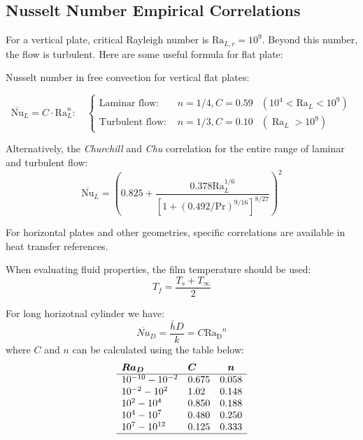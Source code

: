 \subsection*{Nusselt Number Empirical Correlations}
For a vertical plate, critical Rayleigh number is $\mathrm{Ra}_{L,c} = 10^9$. Beyond this number, the flow is turbulent. Here are some useful formula for flat plate:

\begin{definition}
Nusselt number in free convection for vertical flat plates:

\[
    \overline{\mathrm{Nu}}_L=C \cdot \mathrm{Ra}_L^n : \quad
    \left\{
    \begin{array}{ccc}
        \text {Laminar flow: } & n=1 / 4, C=0.59 & \left(10^4<\mathrm{Ra}_L<10^9\right) 
        \\[1.5em]
        \text {Turbulent flow: } &n=1 / 3, C=0.10 & \left(\operatorname{Ra}_L>10^9\right)
    \end{array}\right.
\]

%
Alternatively, the \textit{Churchill} and \textit{Chu} correlation for the entire range of laminar and turbulent flow:
\[
    \overline{\mathrm{Nu}}_L=\left(0.825+\frac{0.378 \mathrm{Ra}_L^{1 / 6}}{\left[1+(0.492 / \mathrm{Pr})^{9 / 16}\right]^{8 / 27}}\right)^2
\]
\end{definition}


For horizontal plates and other geometries, specific correlations are available in heat transfer references.

When evaluating fluid properties, the film temperature should be used:
\[
T_f = \frac{T_s + T_\infty}{2}
\]
%
\begin{definition}
    For long horizotnal cylinder we have:
    \[
    \overline{N u}_D=\frac{\bar{h} D}{k}=C \operatorname{R a_D}^n
    \]
    where $C$ and $n$ can be calculated using the table below:
    \[
        \begin{array}{llc}
        \operatorname{\boldsymbol{R} \boldsymbol{a}_{\boldsymbol{D}}} & \boldsymbol{C} & \boldsymbol{n} \\
        \hline 10^{-10}-10^{-2} & 0.675 & 0.058 \\
        10^{-2}-10^2 & 1.02 & 0.148 \\
        10^2-10^4 & 0.850 & 0.188 \\
        10^4-10^7 & 0.480 & 0.250 \\
        10^7-10^{12} & 0.125 & 0.333 \\
        \hline
        \end{array}
    \]
\end{definition}



